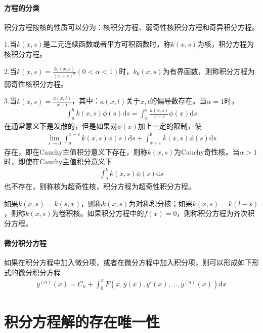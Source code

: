 	\paragraph{方程的分类}积分方程按核的性质可以分为：核积分方程、弱奇性核积分方程和奇异积分方程。
	\par
	1.当$k(x,s)$是二元连续函数或者平方可积函数时，称$k(x,s)$为核，积分方程为核积分方程。
	\par
	2.当$k(x,s) = \frac{k_0(x,s)}{(x-s)^\alpha}(0<\alpha<1)$时，$k_0(x,s)$为有界函数，则称积分方程为弱奇性核积分方程。
	\par
	3.当$k(x,s) = \frac{a(x,t)}{x-t}$，其中：$a(x,t)$关于$x,t$的偏导数存在。当$\alpha = 1$时，
	\begin{align*}
		\int_a^b k(x,s) \phi(s) \mathrm{d}s = \int_a^b\frac{a(x,s)}{x-s}\phi(x) \mathrm{d}s
	\end{align*}
	在通常意义下是发散的，但是如果对$\phi(x)$加上一定的限制，使
	\begin{align*}
		\lim_{\varepsilon \rightarrow 0} \int_a^{x - \varepsilon} k(x,s) \phi(s) \mathrm{d}s + \int_{x+\varepsilon}^b k(x,s) \phi(s) \mathrm{d}s
	\end{align*}
	存在，即在Cauchy主值积分意义下存在，则称$k(x,s)$为Cauchy奇性核。当$\alpha>1$时，即使在Cauchy主值积分意义下
	\begin{align*}
	\int_a^b k(x,s)\phi(s) \mathrm{d}s
	\end{align*}
	也不存在，则称核为超奇性核，积分方程为超奇性积分方程。
	\par
	如果$k(x,s) = k(s,x)$，则称$k(x,s)$为对称积分核；如果$k(x,s) = k(l-s)$，则称$k(x,s)$为卷积核。如果积分方程中的$f(x) = 0$，则称积分方程为齐次积分方程。
	\paragraph{微分积分方程}如果在积分方程中加入微分项，或者在微分方程中加入积分项，则可以形成如下形式的微分积分方程
	\begin{align*}
		y^{(n)}(x) = C_n + \int_0^x F(x,y(x),y'(x),\dots,y^{(n)}(x))\mathrm{d}x
	\end{align*}

\section{积分方程解的存在唯一性}
	\label{sec:积分方程解的存在唯一性}
